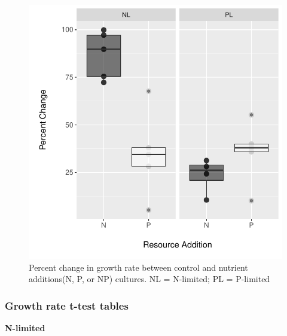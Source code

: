 \documentclass[]{article}
\begin{document}
\begin{figure}[htbp]
\centering
\includegraphics{analysis_ecoevostoich_files/figure-latex/perc.change-1.pdf}
\caption{Percent change in growth rate between control and nutrient
additions(N, P, or NP) cultures. NL = N-limited; PL = P-limited}
\end{figure}

\newpage

\subsubsection{Growth rate t-test
tables}\label{growth-rate-t-test-tables}

\textbf{N-limited}
\end{document}
